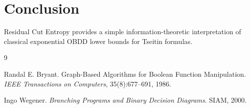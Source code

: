 \documentclass[11pt]{article}
\begin{document}
\section{Conclusion}

Residual Cut Entropy provides a simple information-theoretic interpretation of classical exponential OBDD lower bounds for Tseitin formulas.

\begin{thebibliography}{9}

Randal E. Bryant.
Graph-Based Algorithms for Boolean Function Manipulation.
\emph{IEEE Transactions on Computers}, 35(8):677--691, 1986.

Ingo Wegener.
\emph{Branching Programs and Binary Decision Diagrams}.
SIAM, 2000.

\end{thebibliography}
\end{document}
